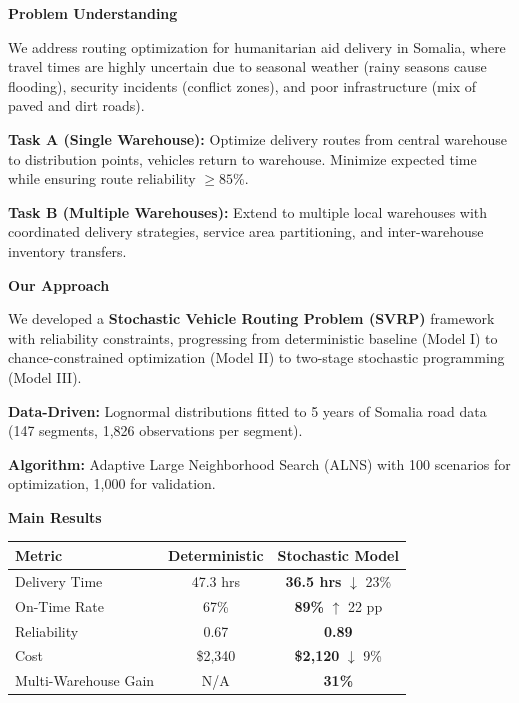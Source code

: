 \textbf{\Large Problem Understanding}

We address routing optimization for humanitarian aid delivery in Somalia, where travel times are highly uncertain due to seasonal weather (rainy seasons cause flooding), security incidents (conflict zones), and poor infrastructure (mix of paved and dirt roads).

\noindent \textbf{Task A (Single Warehouse):} Optimize delivery routes from central warehouse to distribution points, vehicles return to warehouse. Minimize expected time while ensuring route reliability $\geq 85\%$.

\noindent \textbf{Task B (Multiple Warehouses):} Extend to multiple local warehouses with coordinated delivery strategies, service area partitioning, and inter-warehouse inventory transfers.

\vspace{0.4cm}

\textbf{\Large Our Approach}

We developed a \textbf{Stochastic Vehicle Routing Problem (SVRP)} framework with reliability constraints, progressing from deterministic baseline (Model I) to chance-constrained optimization (Model II) to two-stage stochastic programming (Model III).

\noindent \textbf{Data-Driven:} Lognormal distributions fitted to 5 years of Somalia road data (147 segments, 1,826 observations per segment).

\noindent \textbf{Algorithm:} Adaptive Large Neighborhood Search (ALNS) with 100 scenarios for optimization, 1,000 for validation.

\vspace{0.4cm}

\textbf{\Large Main Results}

\begin{table}[H]
\centering
\begin{tabular}{lcc}
\toprule
\textbf{Metric} & \textbf{Deterministic} & \textbf{Stochastic Model} \\
\midrule
Delivery Time & 47.3 hrs & \textbf{36.5 hrs} $\downarrow$ 23\% \\
On-Time Rate & 67\% & \textbf{89\%} $\uparrow$ 22 pp \\
Reliability & 0.67 & \textbf{0.89} \\
Cost & \$2,340 & \textbf{\$2,120} $\downarrow$ 9\% \\
Multi-Warehouse Gain & N/A & \textbf{31\%} \\
\bottomrule
\end{tabular}
\end{table}

